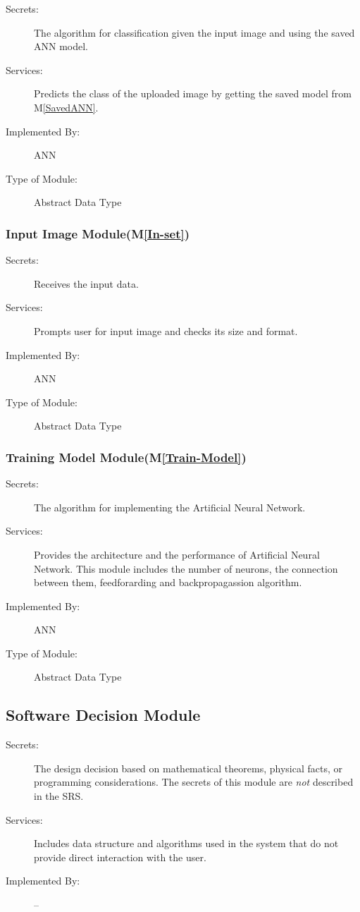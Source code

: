 \documentclass[12pt, titlepage]{article}
\newcommand{\mref}[1]{M\ref{#1}}
\begin{document}
\begin{description}
  \item[Secrets:]The algorithm for classification given the input image and using the 
  saved ANN model.
  \item[Services:]Predicts the class of the uploaded image by getting the saved model from \mref{SavedANN}.
  \item[Implemented By:] ANN
  \item[Type of Module:] Abstract Data Type
\end{description}


\subsubsection{Input Image Module(\mref{In-set})}

\begin{description}
  \item[Secrets:]Receives the input data.
  \item[Services:]Prompts user for input image and checks its size and format.
  \item[Implemented By:] ANN
  \item[Type of Module:] Abstract Data Type
\end{description}

\subsubsection{Training Model Module(\mref{Train-Model})}

\begin{description}
  \item[Secrets:]The algorithm for implementing the Artificial Neural Network.
  \item[Services:]Provides the architecture and the performance of Artificial Neural Network. 
  This module includes the number of neurons, the connection between them, feedforarding and backpropagassion 
  algorithm.
  \item[Implemented By:] ANN
  \item[Type of Module:] Abstract Data Type
\end{description}

\subsection{Software Decision Module}

\begin{description}
\item[Secrets:] The design decision based on mathematical theorems, physical
  facts, or programming considerations. The secrets of this module are
  \emph{not} described in the SRS.
\item[Services:] Includes data structure and algorithms used in the system that
  do not provide direct interaction with the user. 
\item[Implemented By:] --
\end{description}
\end{document}
